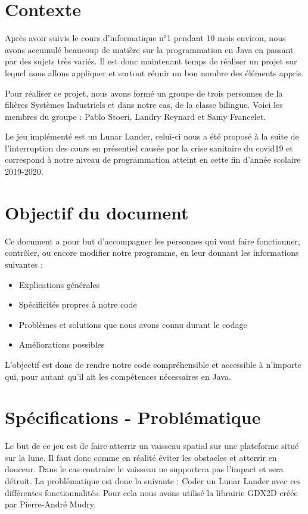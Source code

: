 \section{Contexte}
Après avoir suivis le cours d’informatique n°1 pendant 10 mois environ, nous avons accumulé beaucoup de matière sur la programmation en Java en passant par des sujets très variés. Il est donc maintenant temps de réaliser un projet sur lequel nous allons appliquer et surtout réunir un bon nombre des éléments appris.

Pour réaliser ce projet, nous avons formé un groupe de trois personnes de la filières Systèmes Industriels et dans notre cas, de la classe bilingue. Voici les membres du groupe : Pablo Stoeri, Landry Reynard et Samy Francelet.

Le jeu implémenté est un Lunar Lander, celui-ci nous a été proposé à la suite de l’interruption des cours en présentiel causée par la crise sanitaire du covid19 et correspond à notre niveau de programmation atteint en cette fin d’année scolaire 2019-2020.

\section{Objectif du document}
Ce document a pour but d’accompagner les personnes qui vont faire fonctionner, contrôler, ou encore modifier notre programme, en leur donnant les informations suivantes :
\begin{itemize}
\item	Explications générales
\item	Spécificités propres à notre code
\item	Problèmes et solutions que nous avons connu durant le codage
\item	Améliorations possibles
\end{itemize}
L’objectif est donc de rendre notre code compréhensible et accessible à n’importe qui, pour autant qu’il ait les compétences nécessaires en Java.


\section{Spécifications - Problématique}
Le but de ce jeu est de faire atterrir un vaisseau spatial sur une plateforme situé sur la lune. Il faut donc comme en réalité éviter les obstacles et atterrir en douceur. Dans le cas contraire le vaisseau ne supportera pas l’impact et sera détruit.
La problématique est donc la suivante : Coder un Lunar Lander avec ces différentes fonctionnalités.
Pour cela nous avons utilisé la librairie GDX2D créée par Pierre-André Mudry\cite{GDX2D}.

